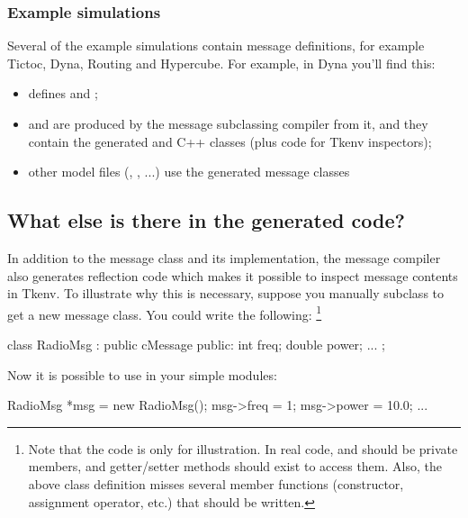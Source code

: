 \subsubsection{Example simulations}

Several of the example simulations contain message definitions, for example
Tictoc, Dyna, Routing and Hypercube. For example, in Dyna you'll find this:

\begin{itemize}
 \item {} defines  and ;
 \item {} and  are produced
   by the message subclassing compiler from it, and they contain
   the generated  and 
   C++ classes (plus code for Tkenv inspectors);
 \item other model files (, , ...)
   use the generated message classes
\end{itemize}



\subsection{What else is there in the generated code?}

In addition to the message class and its implementation,
the message compiler also generates reflection code which makes it
possible to inspect message contents in Tkenv.
To illustrate why this is necessary, suppose you manually subclass
 to get a new message class. You could write the following:
  \footnote{Note that the code is only for illustration.
  In real code,  and  should be private members,
  and getter/setter methods should exist to access them.
  Also, the above class definition misses several member functions
  (constructor, assignment operator, etc.) that should be written.}

\begin{cpp}
class RadioMsg : public cMessage
{
  public:
    int freq;
    double power;
    ...
};
\end{cpp}

Now it is possible to use  in your simple modules:

\begin{cpp}
RadioMsg *msg = new RadioMsg();
msg->freq = 1;
msg->power = 10.0;
...
\end{cpp}

